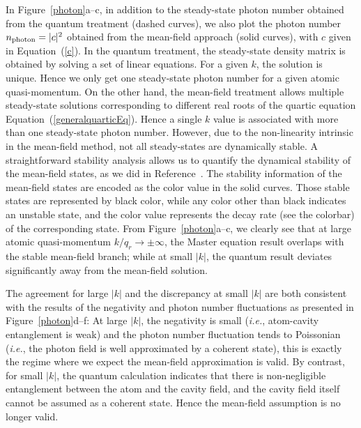 \documentclass[atoms,article,accept,moreauthors,pdftex,12pt,a4paper]{mdpi}
\begin{document}
In Figure~\ref{photon}a--c, in addition to the steady-state photon number obtained from the quantum treatment (dashed curves), we also plot the photon number $n_{\rm photon}=|c|^2$ obtained from the mean-field approach (solid curves), with $c$ given in Equation~(\ref{c}). In the quantum treatment, the steady-state density matrix is obtained by solving a set of linear equations. For a given $k$, the solution is unique. Hence we only get one steady-state photon number for a given atomic quasi-momentum. On the other hand, the mean-field treatment allows multiple steady-state solutions corresponding to different real roots of the quartic equation Equation~(\ref{generalquarticEq}). Hence a single $k$ value is associated with more than one steady-state photon number. However, due to the non-linearity intrinsic in the mean-field method, not all steady-states are dynamically stable. A straightforward stability analysis allows us to quantify the dynamical stability of the mean-field states, as we did in Reference~\cite{cavitySOC}. The stability information of the mean-field states are encoded as the color value in the solid curves. Those stable states are represented by black color, while any color other than black indicates an unstable state, and the color value represents the decay rate (see the colorbar) of the corresponding state. From Figure~\ref{photon}a--c, we clearly see that at large atomic quasi-momentum $k/q_r \rightarrow  \pm \infty$, the Master equation result overlaps with the stable mean-field branch; while at small $|k|$, the quantum result deviates significantly away from the mean-field solution.

The agreement for large $|k|$ and the discrepancy at small $|k|$ are both consistent with the results of the negativity and photon number fluctuations as presented in Figure~\ref{photon}d--f: At large $|k|$, the negativity is small (\emph{i.e.}, atom-cavity entanglement is weak) and the photon number fluctuation tends to Poissonian (\emph{i.e.}, the photon field is well approximated by a coherent state), this is exactly the regime where we expect the mean-field approximation is valid. By contrast, for small $|k|$, the quantum calculation indicates that there is non-negligible entanglement between the atom and the cavity field, and the cavity field itself cannot be assumed as a coherent state. Hence the mean-field assumption is no longer valid.
\end{document}
